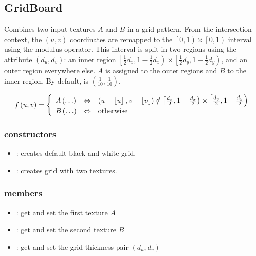 \subsection{GridBoard}

Combines two input textures $A$ and $B$ in a grid pattern.  From the intersection context, the $\left(u, v\right)$ coordinates are remapped to the $\left[0, 1\right) \times \left[0, 1\right)$ interval using the modulus operator.  This interval is split in two regions using the  attribute $\left(d_u, d_v\right)$: an inner region $\left[\frac 1 2 d_x , 1-\frac 1 2 d_x\right) \times \left[\frac 1 2 d_y, 1-\frac 1 2 d_y\right)$, and an outer region everywhere else.  $A$ is assigned to the outer regions and $B$ to the inner region.  By default,  is $\left(\frac 1 {10}, \frac 1 {10}\right)$.

\begin{equation}
	f\left(u, v\right) = \left\{
		\begin{array}{lcl}
			A\left(\ldots\right) & \Leftrightarrow & 
				\left(u - \left\lfloor u \right\rfloor, v - \left\lfloor v \right\rfloor\right) \notin 
				\left[\frac {d_x} 2, 1-\frac {d_x} 2\right) \times 
				\left[\frac {d_y} 2, 1-\frac {d_y} 2\right)\\
			B\left(\ldots\right) & \Leftrightarrow & \textnormal{otherwise}
		\end{array}
	\right.
\end{equation}

\subsubsection*{constructors}
\begin{itemize}
	\item {}: 
		creates default black and white grid.
	\item {}: 
		creates grid with two textures.
\end{itemize}

\subsubsection*{members}
\begin{itemize}
	\item {}: 
		get and set the first texture $A$
	\item {}: 
		get and set the second texture $B$
	\item {}: 
		get and set the grid thickness pair $\left(d_u, d_v\right)$
\end{itemize}



